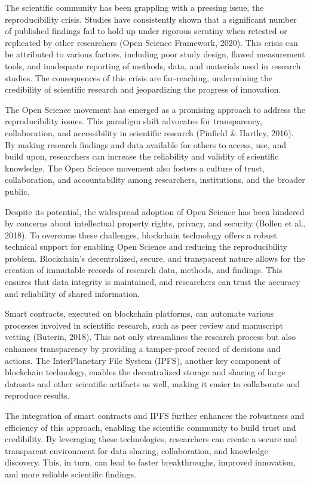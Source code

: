 


The scientific community has been grappling with a pressing issue, the reproducibility crisis. Studies have consistently shown that a significant number of published findings fail to hold up under rigorous scrutiny when retested or replicated by other researchers (Open Science Framework, 2020). This crisis can be attributed to various factors, including poor study design, flawed measurement tools, and inadequate reporting of methods, data, and materials used in research studies. The consequences of this crisis are far-reaching, undermining the credibility of scientific research and jeopardizing the progress of innovation.

The Open Science movement has emerged as a promising approach to address the reproducibility issues. This paradigm shift advocates for transparency, collaboration, and accessibility in scientific research (Pinfield & Hartley, 2016). By making research findings and data available for others to access, use, and build upon, researchers can increase the reliability and validity of scientific knowledge. The Open Science movement also fosters a culture of trust, collaboration, and accountability among researchers, institutions, and the broader public.

Despite its potential, the widespread adoption of Open Science has been hindered by concerns about intellectual property rights, privacy, and security (Bollen et al., 2018). To overcome these challenges, blockchain technology offers a robust technical support for enabling Open Science and reducing the reproducibility problem. Blockchain's decentralized, secure, and transparent nature allows for the creation of immutable records of research data, methods, and findings. This ensures that data integrity is maintained, and researchers can trust the accuracy and reliability of shared information.

Smart contracts, executed on blockchain platforms, can automate various processes involved in scientific research, such as peer review and manuscript vetting (Buterin, 2018). This not only streamlines the research process but also enhances transparency by providing a tamper-proof record of decisions and actions. The InterPlanetary File System (IPFS), another key component of blockchain technology, enables the decentralized storage and sharing of large datasets and other scientific artifacts as well, making it easier to collaborate and reproduce results.

The integration of smart contracts and IPFS further enhances the robustness and efficiency of this approach, enabling the scientific community to build trust and credibility. By leveraging these technologies, researchers can create a secure and transparent environment for data sharing, collaboration, and knowledge discovery. This, in turn, can lead to faster breakthroughs, improved innovation, and more reliable scientific findings.

